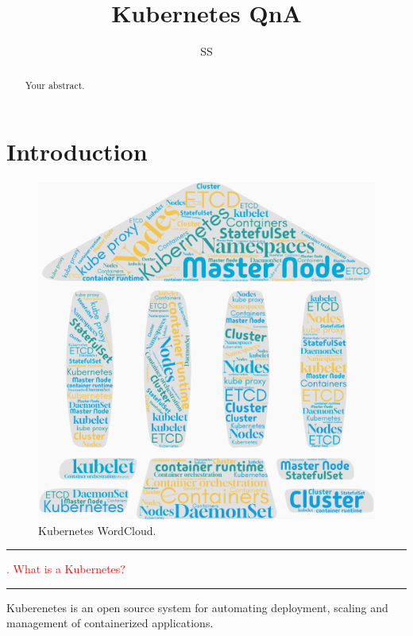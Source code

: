 \documentclass{article}
\title{Kubernetes QnA}
\author{SS}
\begin{document}
\maketitle

\begin{abstract}
Your abstract.
\end{abstract}

\section{Introduction}

\begin{figure}
\centering
\includegraphics[width=0.95\linewidth]{k8sDiagrams/k8swordcloud.png}
\caption{\label{fig:k8s0}Kubernetes WordCloud.}
\end{figure} 

% 
\noindent
{\color{red} \rule{\linewidth}{0.5mm}}
\textcolor{red}{. What is a Kubernetes?} \\
\noindent
{\color{red} \rule{\linewidth}{0.5mm}}
Kuberenetes is an open source system for automating deployment, scaling and management of containerized applications. \\
\end{document}
